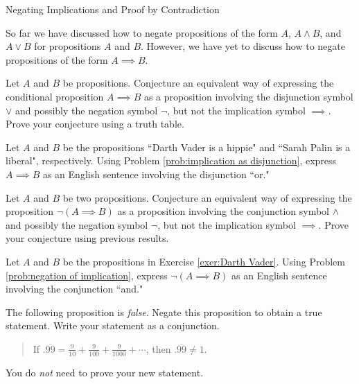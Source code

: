 \begin{section}{Negating Implications and Proof by Contradiction}

So far we have discussed how to negate propositions of the form $A$, $A\wedge B$, and $A\vee B$ for propositions $A$ and $B$.  However, we have yet to discuss how to negate propositions of the form $A\implies B$.

\begin{problem}\label{prob:implication as disjunction}
Let $A$ and $B$ be propositions.  Conjecture an equivalent way of expressing the conditional proposition $A\implies B$ as a proposition involving the disjunction symbol $\vee$ and possibly the negation symbol $\neg$, but not the implication symbol $\implies$.  Prove your conjecture using a truth table.
\end{problem}

\begin{exercise}\label{exer:Darth Vader}
Let $A$ and $B$ be the propositions ``Darth Vader is a hippie" and ``Sarah Palin is a liberal", respectively.  Using Problem \ref{prob:implication as disjunction}, express $A\implies B$ as an English sentence involving the disjunction ``or."
\end{exercise}

\begin{problem}[*]\label{prob:negation of implication}
Let $A$ and $B$ be two propositions.  Conjecture an equivalent way of expressing the proposition $\neg(A\implies B)$ as a proposition involving the conjunction symbol $\wedge$ and possibly the negation symbol $\neg$, but not the implication symbol $\implies$.  Prove your conjecture using previous results.
\end{problem}

\begin{exercise}
Let $A$ and $B$ be the propositions in Exercise \ref{exer:Darth Vader}.  Using Problem \ref{prob:negation of implication}, express $\neg(A\implies B)$ as an English sentence involving the conjunction ``and."
\end{exercise}

\begin{exercise}
The following proposition is \emph{false}.  Negate this proposition to obtain a true statement.  Write your statement as a conjunction.
\begin{quote}
If $.\overline{99}=\frac{9}{10}+\frac{9}{100}+\frac{9}{1000}+\cdots$, then $.\overline{99}\neq 1$.
\end{quote}
You do \emph{not} need to prove your new statement.
\end{exercise}


\end{section}
